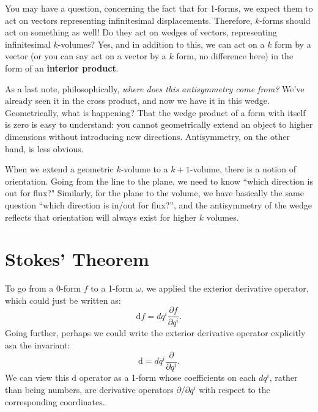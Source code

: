 	You may have a question, concerning the fact that for 1-forms, we expect them to act on vectors representing infinitesimal displacements. Therefore, $k$-forms should act on something as well! Do they act on wedges of vectors, representing infinitesimal $k$-volumes? Yes, and in addition to this, we can act on a $k$ form by a vector (or you can say act on a vector by a $k$ form, no difference here) in the form of an \textbf{interior product}. 
	
	
	As a last note, philosophically, \emph{where does this antisymmetry come from?} We've already seen it in the cross product, and now we have it in this wedge. Geometrically, what is happening? That the wedge product of a form with itself is zero is easy to understand: you cannot geometrically extend an object to higher dimensions without introducing new directions. Antisymmetry, on the other hand, is less obvious.
	
	 When we extend a geometric $k$-volume to a $k+1$-volume, there is a notion of orientation. Going from the line to the plane, we need to know ``which direction is out for flux?" Similarly, for the plane to the volume, we have basically the same question ``which direction is in/out for flux?'', and the antisymmetry of the wedge reflects that orientation will always exist for higher $k$ volumes.
	
	
	\section{Stokes' Theorem} %
	\label{sec:stokes_theorem}
	
	
	To go from a 0-form $f$ to a 1-form $\omega$, we applied the exterior derivative operator, which could just be written as:
	\begin{equation}
		\mathrm df = dq^i \frac{\partial f}{\partial q^i}.
	\end{equation}
	Going further, perhaps we could write the exterior derivative operator explicitly asa the invariant: 
	\begin{equation}\label{eq:exterior_derivative}
		\mathrm d = dq^i \frac{\partial}{\partial q^i}.
	\end{equation}
	We can view this $\mathrm d$ operator as a 1-form whose coefficients on each $dq^i$, rather than being numbers, are derivative operators $\partial/\partial q^i$ with respect to the corresponding coordinates. 
	
